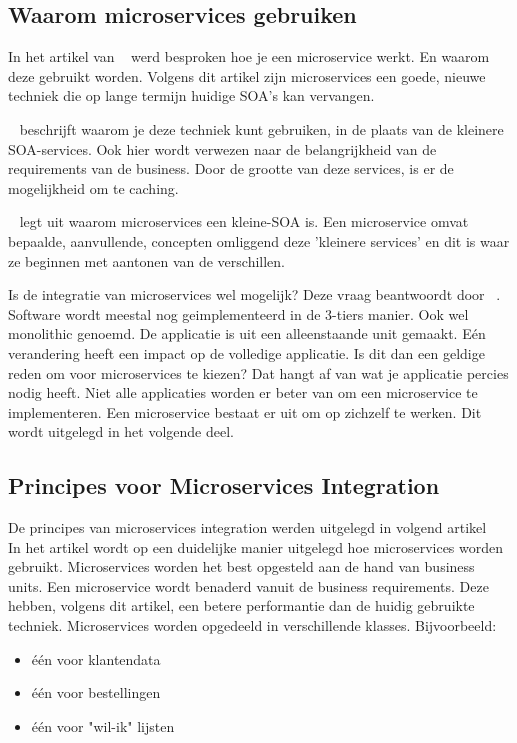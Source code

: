 \subsection{Waarom microservices gebruiken} 
In het artikel van ~\cite{Gunaratne2018} werd besproken hoe je een microservice werkt. En waarom deze gebruikt worden. Volgens dit artikel zijn microservices een goede, nieuwe techniek die op lange termijn huidige SOA's kan vervangen. 

~\cite{Atrash2018} beschrijft waarom je deze techniek kunt gebruiken, in de plaats van de kleinere SOA-services. Ook hier wordt verwezen naar de belangrijkheid van de requirements van de business. Door de grootte van deze services, is er de mogelijkheid om te caching. 

~\cite{devoteam2018} legt uit waarom microservices een kleine-SOA is. Een microservice omvat bepaalde, aanvullende, concepten omliggend deze 'kleinere services' en dit is waar ze beginnen met aantonen van de verschillen.

Is de integratie van microservices wel mogelijk? Deze vraag beantwoordt door ~\cite{VanBart2018}. Software wordt meestal nog geimplementeerd in de 3-tiers manier. Ook wel monolithic genoemd. De applicatie is uit een alleenstaande unit gemaakt. Eén verandering heeft een impact op de volledige applicatie. Is dit dan een geldige reden om voor microservices te kiezen? Dat hangt af van wat je applicatie percies nodig heeft. Niet alle applicaties worden er beter van om een microservice te implementeren. Een microservice  bestaat er uit om op zichzelf te werken. Dit wordt uitgelegd in het volgende deel.

\subsection{Principes voor Microservices Integration}

De principes van microservices integration werden uitgelegd in volgend artikel ~\cite{Aradheye2018}
In het artikel wordt op een duidelijke manier uitgelegd hoe microservices worden gebruikt. Microservices worden het best opgesteld aan de hand van business units. Een microservice wordt benaderd vanuit de business requirements. Deze hebben, volgens dit artikel, een betere performantie dan de huidig gebruikte techniek. Microservices worden opgedeeld in verschillende klasses. Bijvoorbeeld:
\begin{itemize}
	\item één voor klantendata
	\item één voor bestellingen
	\item één voor "wil-ik" lijsten
\end{itemize}

